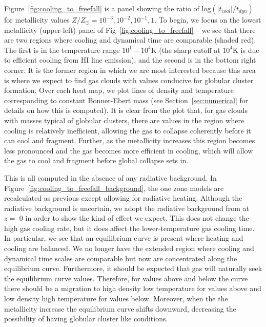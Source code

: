 \documentclass[useAMS,usenatbib]{mn2e}
\begin{document}
Figure~\ref{fig:cooling_to_freefall} is a panel showing the ratio of log$(|t_{cool}|/t_{dyn})$ for metallicity values $Z/Z_{\odot}=10^{-3},10^{-2},10^{-1},1$.  To begin, we focus on the lowest metallicity  (upper-left) panel of Fig~\ref{fig:cooling_to_freefall} -- we see that there are two regions where cooling and dynamical time are comparable (shaded red). The first is in the temperature range $10^1-10^4$K (the sharp cutoff at $10^4$K is due to efficient cooling from HI line emission), and the second is in the bottom right corner. It is the former region in which we are most interested because this area is where we expect to find gas clouds with values conducive for globular cluster formation. Over each heat map, we plot lines of density and temperature corresponding to constant Bonner-Ebert mass (see Section~\ref{sec:numerical} for details on how this is computed). It is clear from the plot that, for gas clouds with masses typical of globular clusters, there are values in the region where cooling is relatively inefficient, allowing the gas to collapse coherently before it can cool and fragment. Further, as the metallicity increases this region becomes less pronounced and the gas becomes more efficient in cooling, which will allow the gas to cool and fragment before global collapse sets in.

This is all computed in the absence of any radiative background.  In Figure~\ref{fig:cooling_to_freefall_background}, 
the one zone models are recalculated as previous except allowing for radiative heating.   Although the radiative background
is uncertain, we adopt the radiative background from \citet{Haardt2012} at $z=$ 0 
in order to show the kind of effect we expect.  This does not change the high gas cooling rate, but it does affect the lower-temperature gas cooling time.   In particular, we see that an equilibrium curve is present where
heating and cooling are balanced. We no longer have the extended region where cooling and dynamical time scales are 
comparable but now are concentrated along the equilibrium curve. Furthermore, it should be expected that gas will
naturally seek the equilibrium curve values. Therefore, for values above and below the curve there should be a migration
to high density low temperature for values above and low density high temperature for values below.  Moreover, when the
the metallicity increase the equilibrium curve shifts downward, decreasing the possibility of having globular cluster
like conditions.
\end{document}
